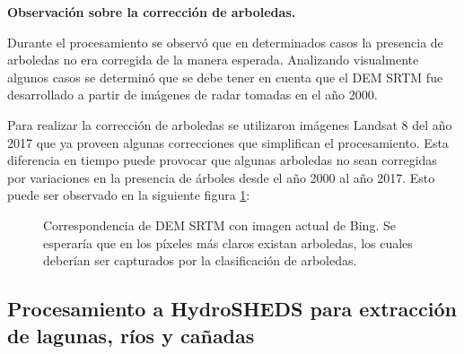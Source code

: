 \documentclass[10pt,a4paper, twoside]{report}
\begin{document}
\textbf{Observación sobre la corrección de arboledas.}
\label{obscorreccionArboledas}

Durante el procesamiento se observó que en determinados casos la presencia de arboledas no era corregida de la manera esperada. Analizando visualmente algunos casos se determinó que se debe tener en cuenta que el DEM SRTM fue desarrollado a partir de imágenes de radar tomadas en el año 2000.

Para realizar la corrección de arboledas se utilizaron imágenes Landsat 8 del año 2017 que ya proveen algunas correcciones que simplifican el procesamiento. Esta diferencia en tiempo puede provocar que algunas arboledas no sean corregidas por variaciones en la presencia de árboles desde el año 2000 al año 2017. Esto puede ser observado en la siguiente figura \ref{fig:observacionArboledas}:

\begin{figure}[H]
	\centering
	\caption{Correspondencia de DEM SRTM con imagen actual de Bing. Se esperaría que en los píxeles más claros existan arboledas, los cuales deberían ser capturados por la clasificación de arboledas.} \label{fig:observacionArboledas}
\end{figure}


\subsection{Procesamiento a HydroSHEDS para extracción de lagunas, ríos y cañadas}
\end{document}
